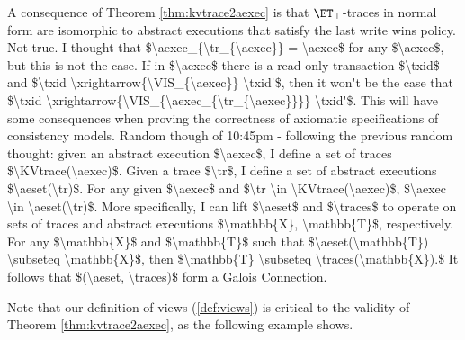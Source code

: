 A consequence of Theorem \ref{thm:kvtrace2aexec} is that $\ET_{\top}$-traces in normal form are isomorphic 
to abstract executions that satisfy the last write wins policy.
\ac{Not true. I thought that $\aexec_{\tr_{\aexec}} = \aexec$ for any $\aexec$, but this is not 
the case. If in $\aexec$ there is a read-only transaction $\txid$ and $\txid \xrightarrow{\VIS_{\aexec}} \txid'$, 
then it won't be the case that $\txid \xrightarrow{\VIS_{\aexec_{\tr_{\aexec}}}} \txid'$. This will have some 
consequences when proving the correctness of axiomatic specifications of consistency models.}
\ac{Random though of 10:45pm - following the previous random thought: given an abstract execution $\aexec$, 
I define a set of traces $\KVtrace(\aexec)$. Given a trace $\tr$, I define a set of abstract executions $\aeset(\tr)$. 
For any given $\aexec$ and $\tr \in \KVtrace(\aexec)$, $\aexec \in \aeset(\tr)$. More specifically, I can lift 
$\aeset$ and $\traces$ to operate on sets of traces and abstract executions $\mathbb{X}, \mathbb{T}$, respectively. 
For any $\mathbb{X}$ and $\mathbb{T}$ such that $\aeset(\mathbb{T}) \subseteq \mathbb{X}$, then 
$\mathbb{T} \subseteq \traces(\mathbb{X}).$ It follows that $(\aeset, \traces)$ form a Galois Connection.}

Note that our definition of views (\cref{def:views}) is critical to the validity of Theorem \ref{thm:kvtrace2aexec}, 
as the following example shows. 

